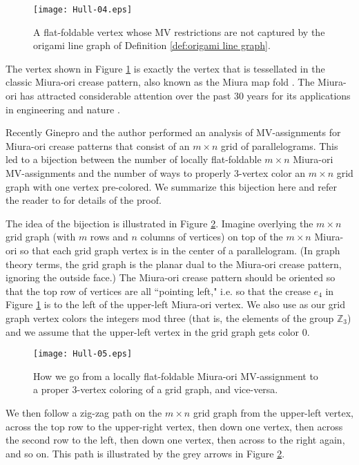 \documentclass{amsart}
\theoremstyle{definition}
\begin{document}
\begin{figure}
\centerline{\texttt{[image: Hull-04.eps]}}
\caption{A flat-foldable vertex whose MV restrictions are not captured by the origami line graph of Definition \ref{def:origami line graph}.}\label{fig:Miuravertex}
\end{figure}

The vertex shown in Figure \ref{fig:Miuravertex} is exactly the vertex that is tessellated in the classic Miura-ori crease pattern, also known as the Miura map fold \cite{Miura1}.  The Miura-ori has attracted considerable attention over the past 30 years for its applications in engineering and nature \cite{Maha1, Wei}.  

Recently Ginepro and the author performed an analysis of MV-assignments for Miura-ori crease patterns that consist of an $m\times n$ grid of parallelograms.  This led to a bijection between the number of locally flat-foldable $m\times n$ Miura-ori MV-assignments and the number of ways to properly 3-vertex color an $m\times n$ grid graph with one vertex pre-colored.  We summarize this bijection here and refer the reader to \cite{GHull} for details of the proof.

The idea of the bijection is illustrated in Figure \ref{fig:Miurabij}.  Imagine overlying the $m\times n$ grid graph (with $m$ rows and $n$ columns of vertices) on top of the $m\times n$ Miura-ori so that each grid graph vertex is in the center of a parallelogram.  (In graph theory terms, the grid graph is the planar dual to the Miura-ori crease pattern, ignoring the outside face.)  The Miura-ori crease pattern should be oriented so that the top row of vertices are all ``pointing left," i.e. so that the crease $e_4$ in Figure \ref{fig:Miuravertex} is to the left of the upper-left Miura-ori vertex.  We also use as our grid graph vertex colors the integers mod three (that is, the elements of the group $\mathbb{Z}_3$) and we assume that the upper-left vertex in the grid graph gets color 0.  


\begin{figure}
\centerline{\texttt{[image: Hull-05.eps]}}
\caption{How we go from a locally flat-foldable Miura-ori MV-assignment to a proper 3-vertex coloring of a grid graph, and vice-versa.}\label{fig:Miurabij}
\end{figure}


We then follow a zig-zag path on the $m\times n$ grid graph from the upper-left vertex, across the top row to the upper-right vertex, then down one vertex, then across the second row to the left, then down one vertex, then across to the right again, and so on.  This path is illustrated by the grey arrows in Figure \ref{fig:Miurabij}.  
\end{document}
